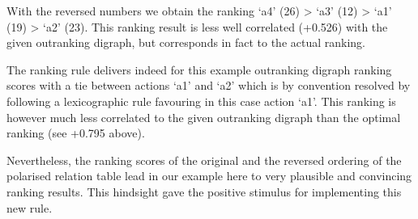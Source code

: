 \documentclass[a4paper,12pt,english]{sphinxhowto}
\begin{document}
\sphinxAtStartPar
With the reversed  numbers we obtain the ranking ‘a4’ (26) \textgreater{} ‘a3’ (\sphinxhyphen{}12) \textgreater{} ‘a1’ (\sphinxhyphen{}19) \textgreater{} ‘a2’ (\sphinxhyphen{}23). This ranking result is less well correlated (+0.526) with the given outranking digraph, but corresponds in fact to the actual  ranking.

%
\begin{sphinxVerbatim}[commandchars=\\\{\},numbers=left,firstnumber=1,stepnumber=1]
   
  
  
\end{sphinxVerbatim}
\sphinxresetverbatimhllines

\sphinxAtStartPar
The  ranking rule delivers indeed for this example outranking digraph ranking scores with a tie between actions ‘a1’ and ‘a2’ which is by convention resolved by following a lexicographic rule favouring in this case action ‘a1’. This ranking is however much less correlated to the given outranking digraph than the optimal  ranking (see +0.795 above).

\sphinxAtStartPar
Nevertheless, the  ranking scores of the original and the reversed ordering of the polarised relation table lead in our example here to very plausible and convincing ranking results. This hindsight gave the positive stimulus for implementing this new  rule.
\end{document}
